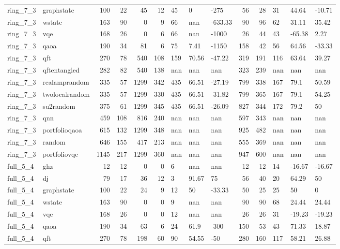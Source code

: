 \begin{longtable}{llrrrrlllrrlll}
ring\_7\_3 & graphstate & 100 & 22 & 45 & 12 & 45 & 0 & -275 & 56 & 28 & 31 & 44.64 & -10.71 \\
ring\_7\_3 & wstate & 163 & 90 & 0 & 9 & 66 & nan & -633.33 & 90 & 96 & 62 & 31.11 & 35.42 \\
ring\_7\_3 & vqe & 168 & 26 & 0 & 6 & 66 & nan & -1000 & 26 & 44 & 43 & -65.38 & 2.27 \\
ring\_7\_3 & qaoa & 190 & 34 & 81 & 6 & 75 & 7.41 & -1150 & 158 & 42 & 56 & 64.56 & -33.33 \\
ring\_7\_3 & qft & 270 & 78 & 540 & 108 & 159 & 70.56 & -47.22 & 319 & 191 & 116 & 63.64 & 39.27 \\
ring\_7\_3 & qftentangled & 282 & 82 & 540 & 138 & nan & nan & nan & 323 & 239 & nan & nan & nan \\
ring\_7\_3 & realamprandom & 335 & 57 & 1299 & 342 & 435 & 66.51 & -27.19 & 799 & 338 & 167 & 79.1 & 50.59 \\
ring\_7\_3 & twolocalrandom & 335 & 57 & 1299 & 330 & 435 & 66.51 & -31.82 & 799 & 365 & 167 & 79.1 & 54.25 \\
ring\_7\_3 & su2random & 375 & 61 & 1299 & 345 & 435 & 66.51 & -26.09 & 827 & 344 & 172 & 79.2 & 50 \\
ring\_7\_3 & qnn & 459 & 108 & 816 & 240 & nan & nan & nan & 597 & 343 & nan & nan & nan \\
ring\_7\_3 & portfolioqaoa & 615 & 132 & 1299 & 348 & nan & nan & nan & 925 & 482 & nan & nan & nan \\
ring\_7\_3 & random & 646 & 155 & 417 & 213 & nan & nan & nan & 555 & 369 & nan & nan & nan \\
ring\_7\_3 & portfoliovqe & 1145 & 217 & 1299 & 360 & nan & nan & nan & 947 & 600 & nan & nan & nan \\
full\_5\_4 & ghz & 12 & 12 & 0 & 0 & 6 & nan & nan & 12 & 12 & 14 & -16.67 & -16.67 \\
full\_5\_4 & dj & 79 & 17 & 36 & 12 & 3 & 91.67 & 75 & 56 & 40 & 20 & 64.29 & 50 \\
full\_5\_4 & graphstate & 100 & 22 & 24 & 9 & 12 & 50 & -33.33 & 50 & 25 & 25 & 50 & 0 \\
full\_5\_4 & wstate & 163 & 90 & 0 & 0 & 9 & nan & nan & 90 & 90 & 68 & 24.44 & 24.44 \\
full\_5\_4 & vqe & 168 & 26 & 0 & 0 & 12 & nan & nan & 26 & 26 & 31 & -19.23 & -19.23 \\
full\_5\_4 & qaoa & 190 & 34 & 63 & 6 & 24 & 61.9 & -300 & 150 & 53 & 43 & 71.33 & 18.87 \\
full\_5\_4 & qft & 270 & 78 & 198 & 60 & 90 & 54.55 & -50 & 280 & 160 & 117 & 58.21 & 26.88 \\

\end{longtable}
